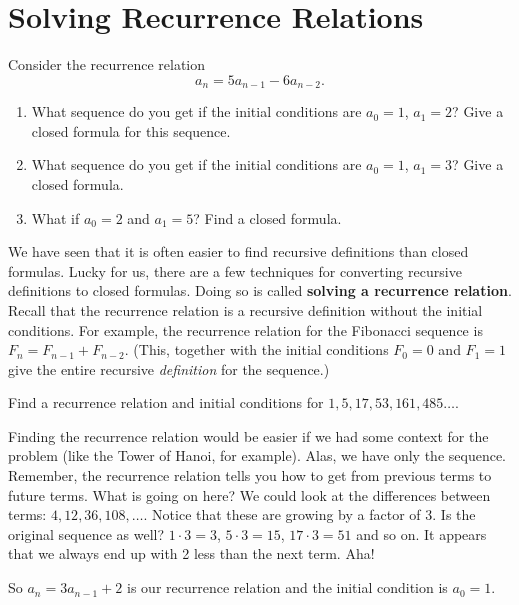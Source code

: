 \documentclass[11pt,]{book}
\newcommand{\terminology}[1]{\textbf{#1}}
\theoremstyle{ptxplainnotitle}
\theoremstyle{ptxplaintitle}
\theoremstyle{ptxdefinitionnotitle}
\theoremstyle{ptxdefinitiontitle}
\theoremstyle{ptxdefinitionnotitle}
\theoremstyle{ptxdefinitiontitle}
\theoremstyle{ptxdefinitionnotitle}
\theoremstyle{ptxdefinitiontitle}
\theoremstyle{ptxdefinitiontitlenonumber}
\theoremstyle{ptxdefinitiontitlenonumber}
\numberwithin{equation}{chapter}
\begin{document}
\section[{Solving Recurrence Relations}]{Solving Recurrence Relations}\label{sec_recurrence}
\begin{investigation}\label{investigation-7}
\hypertarget{p-417}{}%
Consider the recurrence relation%
\begin{equation*}
a_n = 5a_{n-1} - 6a_{n-2}.
\end{equation*}
%
\begin{enumerate}
\item\hypertarget{li-218}{}\hypertarget{p-418}{}%
What sequence do you get if the initial conditions are \(a_0 = 1\), \(a_1 = 2\)? Give a closed formula for this sequence.%
\item\hypertarget{li-219}{}\hypertarget{p-419}{}%
What sequence do you get if the initial conditions are \(a_0 = 1\), \(a_1 = 3\)? Give a closed formula.%
\item\hypertarget{li-220}{}\hypertarget{p-420}{}%
What if \(a_0 = 2\) and \(a_1 = 5\)? Find a closed formula.%
\end{enumerate}
%
\end{investigation}
\hypertarget{p-421}{}%
We have seen that it is often easier to find recursive definitions than closed formulas. Lucky for us, there are a few techniques for converting recursive definitions to closed formulas. Doing so is called \terminology{solving a recurrence relation}. Recall that the recurrence relation is a recursive definition without the initial conditions. For example, the recurrence relation for the Fibonacci sequence is \(F_n = F_{n-1} + F_{n-2}\). (This, together with the initial conditions \(F_0 = 0\) and \(F_1 = 1\) give the entire recursive \emph{definition} for the sequence.)%
\begin{example}\label{example-18}
\hypertarget{p-422}{}%
Find a recurrence relation and initial conditions for \(1, 5, 17, 53, 161, 485\ldots\).%
\par\smallskip%
\noindent\textbf{}\hypertarget{solution-64}{}\hypertarget{p-423}{}%
Finding the recurrence relation would be easier if we had some context for the problem (like the Tower of Hanoi, for example). Alas, we have only the sequence. Remember, the recurrence relation tells you how to get from previous terms to future terms. What is going on here? We could look at the differences between terms: \(4, 12, 36, 108, \ldots\). Notice that these are growing by a factor of 3. Is the original sequence as well? \(1\cdot 3 = 3\), \(5 \cdot 3 = 15\), \(17 \cdot 3 = 51\) and so on. It appears that we always end up with 2 less than the next term. Aha!%
\par
\hypertarget{p-424}{}%
So \(a_n = 3a_{n-1} + 2\) is our recurrence relation and the initial condition is \(a_0 = 1\).%
\end{example}
\end{document}

